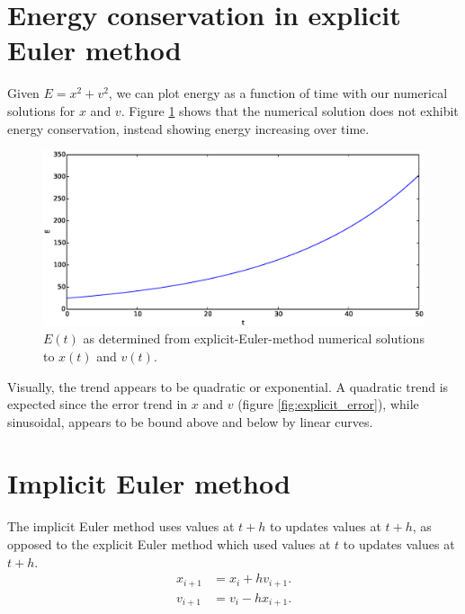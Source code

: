 \documentclass{article}
\theoremstyle{definition}
\renewcommand{\>}{\rangle}
\newcommand{\<}{\langle}
\begin{document}
\section{Energy conservation in explicit Euler method}

Given $E=x^2+v^2$, we can plot energy as a function of time with our
numerical solutions for $x$ and $v$. Figure \ref{fig:explicit_E} shows
that the numerical solution does not exhibit energy conservation, instead
showing energy increasing over time.

\begin{figure}
\includegraphics[width=\textwidth]{explicit_Euler_E.eps}
\caption{\label{fig:explicit_E}$E(t)$ as determined from explicit-Euler-method numerical
solutions to $x(t)$ and $v(t)$.}
\end{figure}

Visually, the trend appears to be quadratic or exponential. A quadratic trend
is expected since the error trend in $x$ and $v$ (figure \ref{fig:explicit_error}),
while sinusoidal, appears to be bound above and below by linear curves.

\section{Implicit Euler method}

The implicit Euler method uses values at $t+h$ to updates values at $t+h$, as
opposed to the explicit Euler method which used values at $t$ to updates values
at $t+h$.
\begin{align*}
x_{i+1} &= x_i + hv_{i+1}. \\
v_{i+1} &= v_i - hx_{i+1}.
\end{align*}
\end{document}
